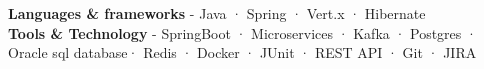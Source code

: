 

\begin{cvparagraph}

\textbf{Languages \& frameworks} - Java · Spring · Vert.x · Hibernate\\
\textbf{Tools \& Technology} - SpringBoot · Microservices · Kafka · Postgres · Oracle sql database· Redis · Docker · JUnit · REST API · Git · JIRA 

\end{cvparagraph}
